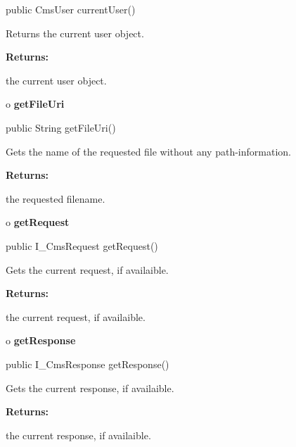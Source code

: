\begin{PRE}
 public CmsUser currentUser()
\end{PRE}

\begin{description}
\htmlDD Returns the current user object. 

\begin{description}
\item {\bf Returns:}  

the current user object.  
\end{description}

\end{description}

o {\bf getFileUri} 

\begin{PRE}
 public String getFileUri()
\end{PRE}

\begin{description}
\htmlDD Gets the name of the requested file without any path-information. 

\begin{description}
\item {\bf Returns:}  

the requested filename.  
\end{description}

\end{description}

o {\bf getRequest} 

\begin{PRE}
 public I\_CmsRequest getRequest()
\end{PRE}

\begin{description}
\htmlDD Gets the current request, if availaible. 

\begin{description}
\item {\bf Returns:}  

the current request, if availaible.  
\end{description}

\end{description}

o {\bf getResponse} 

\begin{PRE}
 public I\_CmsResponse getResponse()
\end{PRE}

\begin{description}
\htmlDD Gets the current response, if availaible. 

\begin{description}
\item {\bf Returns:}  

the current response, if availaible.  
\end{description}

\end{description}

